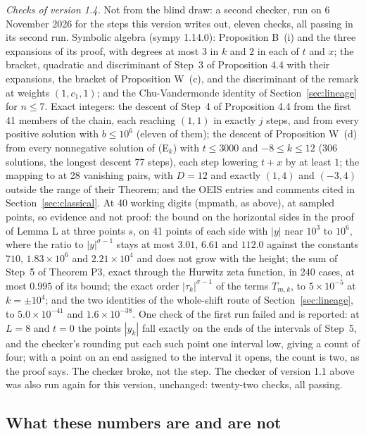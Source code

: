 \documentclass[11pt]{article}
\begin{document}
\medskip
\noindent\emph{Checks of version 1.4.} Not from the blind draw: a second checker, run on 6 November 2026 for the steps this version writes out, eleven checks, all passing in its second run. Symbolic algebra (sympy 1.14.0): Proposition B~(i) and the three expansions of its proof, with degrees at most $3$ in $k$ and $2$ in each of $t$ and $x$; the bracket, quadratic and discriminant of Step~3 of Proposition 4.4 with their expansions, the bracket of Proposition W~(c), and the discriminant of the remark at weights $(1,c_1,1)$; and the Chu-Vandermonde identity of Section~\ref{sec:lineage} for $n\le7$. Exact integers: the descent of Step~4 of Proposition 4.4 from the first 41 members of the chain, each reaching $(1,1)$ in exactly $j$ steps, and from every positive solution with $b\le10^6$ (eleven of them); the descent of Proposition W~(d) from every nonnegative solution of (E$_k$) with $t\le3000$ and $-8\le k\le12$ (306 solutions, the longest descent 77 steps), each step lowering $t+x$ by at least $1$; the mapping to \cite{LS} at 28 vanishing pairs, with $D=12$ and exactly $(1,4)$ and $(-3,4)$ outside the range of their Theorem; and the OEIS entries and comments cited in Section~\ref{sec:classical}. At 40 working digits (mpmath, as above), at sampled points, so evidence and not proof: the bound on the horizontal sides in the proof of Lemma L at three points $s$, on 41 points of each side with $|y|$ near $10^3$ to $10^6$, where the ratio to $|y|^{\sigma-1}$ stays at most $3.01$, $6.61$ and $112.0$ against the constants $710$, $1.83\times10^6$ and $2.21\times10^4$ and does not grow with the height; the sum of Step~5 of Theorem P3, exact through the Hurwitz zeta function, in 240 cases, at most $0.995$ of its bound; the exact order $|\tau_k|^{\sigma-1}$ of the terms $T_{m,k}$, to $5\times10^{-5}$ at $k=\pm10^4$; and the two identities of the whole-shift route of Section~\ref{sec:lineage}, to $5.0\times10^{-41}$ and $1.6\times10^{-38}$. One check of the first run failed and is reported: at $L=8$ and $t=0$ the points $|y_k|$ fall exactly on the ends of the intervals of Step~5, and the checker's rounding put each such point one interval low, giving a count of four; with a point on an end assigned to the interval it opens, the count is two, as the proof says. The checker broke, not the step. The checker of version 1.1 above was also run again for this version, unchanged: twenty-two checks, all passing.

\subsection{What these numbers are and are not}
\end{document}
